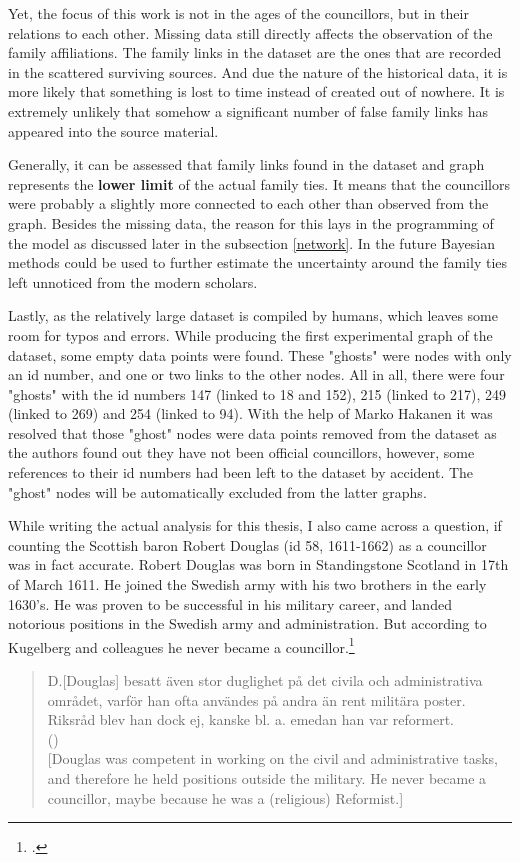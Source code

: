 Yet, the focus of this work is not in the ages of the councillors, but in their relations to each other. Missing data still directly affects the observation of the family affiliations. The family links in the dataset are the ones that are recorded in the scattered surviving sources. And due the nature of the historical data, it is more likely that something is lost to time instead of created out of nowhere. It is extremely unlikely that somehow a significant number of false family links has appeared into the source material.

Generally, it can be assessed that family links found in the dataset and graph represents the \textbf{lower limit} of the actual family ties. It means that the councillors were probably a slightly more connected to each other than observed from the graph. Besides the missing data, the reason for this lays in the programming of the model as discussed later in the subsection \ref{network}. In the future Bayesian methods could be used to further estimate the uncertainty around the family ties left unnoticed from the modern scholars.

Lastly, as the relatively large dataset is compiled by humans, which leaves some room for typos and errors. While producing the first experimental graph of the dataset, some empty data points were found. These "ghosts" were nodes with only an id number, and one or two links to the other nodes. All in all, there were four "ghosts" with the id numbers 147 (linked to 18 and 152), 215 (linked to 217), 249 (linked to 269) and 254 (linked to 94). With the help of Marko Hakanen it was resolved that those "ghost" nodes were data points removed from the dataset as the authors found out they have not been official councillors, however, some references to their id numbers had been left to the dataset by accident. The "ghost" nodes will be automatically excluded from the latter graphs.

While writing the actual analysis for this thesis, I also came across a question, if counting the Scottish baron Robert Douglas (id 58, 1611-1662) as a councillor was in fact accurate. Robert Douglas was born in Standingstone Scotland in 17th of March 1611. He joined the Swedish army with his two brothers in the early 1630's. He was proven to be successful in his military career, and landed notorious positions in the Swedish army and administration. But according to Kugelberg and colleagues he never became a councillor.\footcite{sbl_robert_douglas}

\begin{quote}
	D.[Douglas] besatt även stor duglighet på det civila och administrativa området, varför han ofta användes på andra än rent militära poster. Riksråd blev han dock ej, kanske bl. a. emedan han var reformert.\\
	(\cite{sbl_robert_douglas})\\
	
	[Douglas was competent in working on the civil and administrative tasks, and therefore he held positions outside the military. He never became a councillor, maybe because he was a (religious) Reformist.]
\end{quote}

